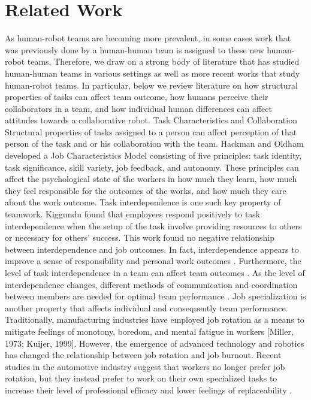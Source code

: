 \section{Related Work}
       As human-robot teams are becoming more prevalent, in some cases work that was previously done by a human-human team is assigned to these new human-robot teams. Therefore, we draw on a strong body of literature that has studied human-human teams in various settings as well as more recent works that study human-robot teams. In particular, below we review literature on how structural properties of tasks can affect team outcome, how humans perceive their collaborators in a team, and how individual human differences can affect attitudes towards a collaborative robot.
Task Characteristics and Collaboration    
       Structural properties of tasks assigned to a person can affect perception of that person of the task and or his collaboration with the team. Hackman and Oldham \cite{hackman1976motivation} developed a Job Characteristics Model consisting of five principles: task identity, task significance, skill variety, job feedback, and autonomy. These principles can affect the psychological state of the workers in how much they learn, how much they feel responsible for the outcomes of the works, and how much they care about the work outcome.  
       Task interdependence is one such key property of teamwork. Kiggundu \cite{kiggundu1983task} found that employees respond positively to task interdependence when the setup of the task involve providing resources to others or necessary for others’ success. This work found no negative relationship between interdependence and job outcomes. In fact, interdependence appears to improve a sense of responsibility and personal  work outcomes \cite{van1998motivating}. Furthermore, the level of task interdependence in a team can affect team outcomes \cite{katz2005collective, langfred2005autonomy, liden1997task}. As the level of interdependence changes, different methods of communication and coordination between members are needed for optimal team performance \cite{espinosa2004explicit, butchibabu2016implicit}.
       Job specialization is another property that affects individual and consequently team performance. Traditionally, manufacturing industries have employed job rotation as a means to mitigate feelings of monotony, boredom, and mental fatigue in workers [Miller, 1973; Kuijer, 1999]. However, the emergence of advanced technology and robotics has changed the relationship between job rotation and job burnout.  Recent studies in the automotive industry suggest that workers no longer prefer job rotation, but they instead prefer to work on their own specialized tasks to increase their level of professional efficacy and lower feelings of replaceability \cite{hsieh2004reassessment}. 
